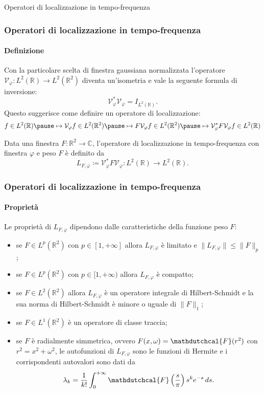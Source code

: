 \documentclass[aspectratio=141]{beamer}
\newcommand{\R}{\mathbb{R}} %
\newcommand{\V}{\mathcal{V}} %
\newcommand{\C}{\mathbb{C}} %
\begin{document}
\begin{section}{Operatori di localizzazione in tempo-frequenza}
	
	\begin{frame}
		\frametitle{Operatori di localizzazione in tempo-frequenza}
		\framesubtitle{Definizione}
		Con la particolare scelta di finestra gaussiana normalizzata l'operatore $\V_{\varphi} : L^2(\R) \rightarrow L^2(\R^2)$ diventa un'isometria e vale la seguente formula di inversione:
		\begin{equation*}
			\V_{\varphi}^* \V_{\varphi} = I_{L^2(\R)}.
		\end{equation*}
		\pause
		Questo suggerisce come definire un operatore di localizzazione:
		\begin{equation*}
			f \in L^2(\R) \pause \mapsto \V_{\varphi} f \in L^2(\R^2) \pause \mapsto F \V_{\varphi} f \in L^2(\R^2) \pause \mapsto \V_{\varphi}^* F \V_{\varphi} f \in L^2(\R)
		\end{equation*}
		\onslide<5-> \begin{myblock}
			Data una finestra $F: \R^2 \rightarrow \C$, l'operatore di localizzazione in tempo-frequenza con finestra $\varphi$ e peso $F$ è definito da
			\begin{equation*}
				L_{F,\varphi} \coloneqq \V_{\varphi}^* F \V_{\varphi} : L^2(\R) \rightarrow L^2(\R).
			\end{equation*}
		\end{myblock}
	\end{frame}

	\begin{frame}
		\frametitle{Operatori di localizzazione in tempo-frequenza}
		\framesubtitle{Proprietà}
		Le proprietà di $L_{F,\varphi}$ dipendono dalle caratteristiche della funzione peso $F$:
		\begin{itemize}
			\item se $F \in L^p (\R^2)$ con $p \in [1,+\infty]$ allora $L_{F,\varphi}$ è limitato e $\|L_{F,\varphi}\| \leq \|F\|_p$; \pause
			\item se $F \in L^p (\R^2)$ con $p \in [1,+\infty)$ allora $L_{F,\varphi}$ è compatto;\pause
			\item se $F \in L^2(\R^2)$ allora $L_{F,\varphi}$ è un operatore integrale di Hilbert-Schmidt e la sua norma di Hilbert-Schmidt è minore o uguale di $\|F\|_1$;\pause
			\item se $F \in L^1(\R^2)$ è un operatore di classe traccia;\pause
			\item se $F$ è radialmente simmetrica, ovvero $F(x,\omega) = \mathdutchcal{F}(r^2)$ con $r^2 = x^2 + \omega^2$, le autofunzioni di $L_{F,\varphi}$ sono le funzioni di Hermite e i corrispondenti autovalori sono dati da
			\begin{equation*}
				\lambda_k = \dfrac{1}{k!} \int_0^{+\infty} \mathdutchcal{F}\left(\dfrac{s}{\pi}\right) s^k e^{-s} \, ds.
			\end{equation*}
		\end{itemize}
	\end{frame}
\end{section}
\end{document}
